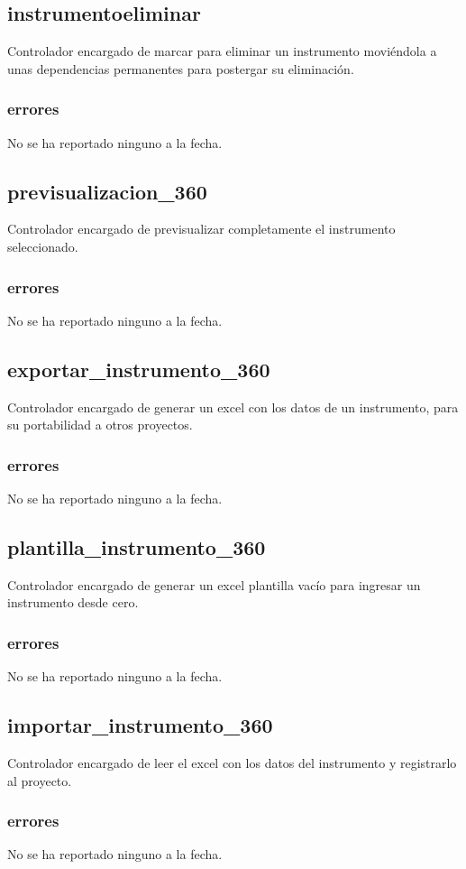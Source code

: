 \documentclass[10pt,a4paper]{book}
\begin{document}
	\subsection{instrumentoeliminar}
	Controlador encargado de marcar para eliminar un instrumento moviéndola a unas dependencias permanentes para postergar su eliminación.
	\subsubsection{errores}
	No se ha reportado ninguno a la fecha.

	\subsection{previsualizacion\_360}
	Controlador encargado de previsualizar completamente el instrumento seleccionado.
	\subsubsection{errores}
	No se ha reportado ninguno a la fecha.

	\subsection{exportar\_instrumento\_360}
	Controlador encargado de generar un excel con los datos de un instrumento, para su portabilidad a otros proyectos.
	\subsubsection{errores}
	No se ha reportado ninguno a la fecha.

	\subsection{plantilla\_instrumento\_360}
	Controlador encargado de generar un excel plantilla vacío para ingresar un instrumento desde cero.
	\subsubsection{errores}
	No se ha reportado ninguno a la fecha.

	\subsection{importar\_instrumento\_360}
	Controlador encargado de leer el excel con los datos del instrumento y registrarlo al proyecto.
	\subsubsection{errores}
	No se ha reportado ninguno a la fecha.
\end{document}
